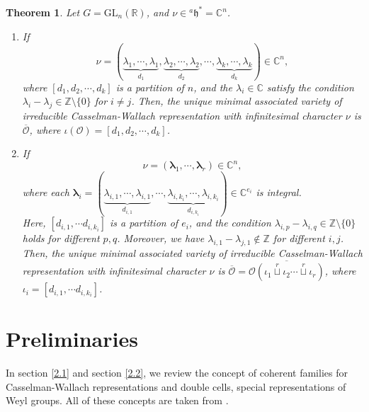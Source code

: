 \documentclass[12pt, a4paper]{amsart}
\numberwithin{equation}{section}
\newtheorem{thm}{Theorem}[section]
\newcommand{\blam}{{\boldsymbol{\lambda}}}
\newcommand{\BC}{{\mathbb {C}}}
\newcommand{\BR}{{\mathbb {R}}}
\newcommand{\BZ}{{\mathbb {Z}}}
\newcommand{\CO}{{\mathcal {O}}}
\newcommand{\fh}{\mathfrak{h}}
\newcommand{\GL}{{\mathrm{GL}}}
\renewcommand{\bar}{\overline}
\begin{document}
\begin{thm}\label{minimal}
    Let $G = \GL_n(\BR)$, and $\nu \in {^{a}\fh}^* = \BC^n$.
    \begin{enumerate}
        \item If 
        \[
        \nu = (\underbrace{\lambda_1, \cdots, \lambda_1}_{d_1}, \underbrace{\lambda_2, \cdots, \lambda_2}_{d_2}, \cdots, \underbrace{\lambda_k, \cdots, \lambda_k}_{d_k}) \in \BC^n,
        \]
        where $[d_1, d_2, \cdots , d_k]$ is a partition of $n$, and the $\lambda_i \in \BC$ satisfy the condition $\lambda_i - \lambda_j \in \BZ \setminus \{0\}$ for $i \neq j$. Then, the unique minimal associated variety of irreducible Casselman-Wallach representation with infinitesimal character $\nu$ is $\bar{\CO}$, where $\iota(\CO) = [d_1, d_2, \cdots, d_k]$.
        \item If
                \[
                \nu = (\blam_1, \cdots, \blam_r) \in \BC^n,
                \]
                where each $\blam_i = (\underbrace{\lambda_{i,1}, \cdots, \lambda_{i,1}}_{d_{i,1}}, \cdots, \underbrace{\lambda_{i,k_i}, \cdots, \lambda_{i,k_i}}_{d_{i,k_i}}) \in \BC^{e_i}$ is integral.\\
                Here, $[d_{i,1}, \cdots d_{i,k_i} ]$ is a partition of $e_i$, and the condition $\lambda_{i,p} - \lambda_{i,q} \in \BZ \setminus \{0\}$ holds for different $p, q$. Moreover, we have $\lambda_{i,1} - \lambda_{j,1} \notin \BZ$ for different $i, j$. Then, the unique minimal associated variety of irreducible Casselman-Wallach representation with infinitesimal character $\nu$ is $\bar{\CO} = \bar{\CO(\iota_1 \mathop{\sqcup}\limits^r \iota_2 \cdots \mathop{\sqcup}\limits^r  \iota_r)} $, where $\iota_i = [d_{i,1}, \cdots d_{i,k_i}]$.
    \end{enumerate}
\end{thm}


\section{Preliminaries}

In section \ref{2.1} and section \ref{2.2}, we review the concept of coherent families for Casselman-Wallach representations and double cells, special representations of Weyl groups. All of these concepts are taken from \cite[Chapter 4]{BMSZ}.
\end{document}
